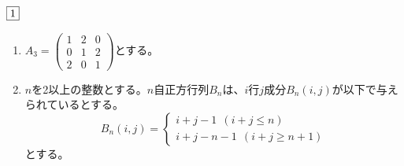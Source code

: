 \begin{tcolorbox} %
	$\fbox{1}$
\begin{enumerate}
	\item $A_3= \begin{pmatrix}1& 2& 0\\ 0& 1& 2\\ 2& 0& 1\end{pmatrix}$とする。
	\item $n$を2以上の整数とする。$n$自正方行列$B_n$は、$i$行$j$成分$B_n(i, j)$が以下で与えられているとする。
\begin{equation*}
	B_n({i, j})= 
\begin{cases}
	i+ j- 1\ \ (i+ j\le n)\\
	i+ j- n- 1\ \ (i+ j\ge n+ 1) 
\end{cases}
\end{equation*}
	とする。
\end{enumerate}
\end{tcolorbox}

